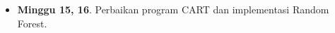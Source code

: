 \begin{itemize}
\item \textbf{Minggu 15, 16}. Perbaikan program CART dan implementasi Random
Forest.
\end{itemize}
